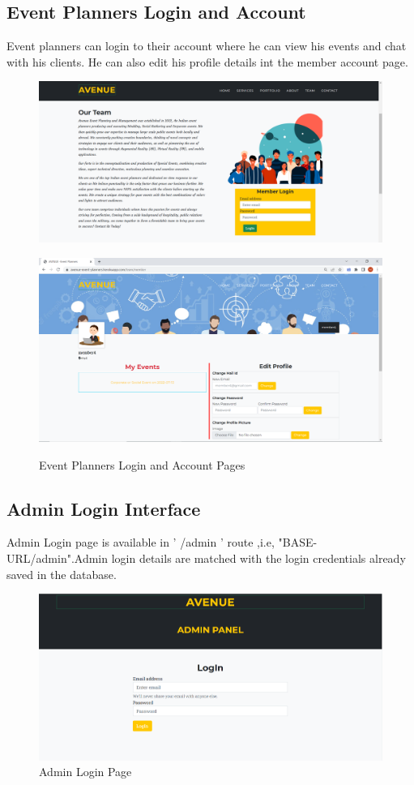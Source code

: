 \subsection{Event Planners Login and Account}
Event planners can login to their account where he can view his events and chat with his clients. He can also edit his profile details int the member account page.
\begin{figure}[H]
	\centering
	\includegraphics[scale=0.33]{memberlogin.png}
\end{figure}
\begin{figure}[H]
	\centering
	\includegraphics[scale=0.35]{memberaccount.png} \\
	\caption{Event Planners Login and Account Pages}
	\label{Event Planners Login and Account Pages}
\end{figure}
\subsection{Admin Login Interface}
Admin Login page is available in ' /admin ' route ,i.e, "BASE-URL/admin".Admin login details are matched with the login credentials already saved in the database.
\begin{figure}[H]
	\centering
	\includegraphics[scale=0.25]{adminlogin.png}
	\caption{Admin Login Page}
	\label{Admin Login Page}
\end{figure}
